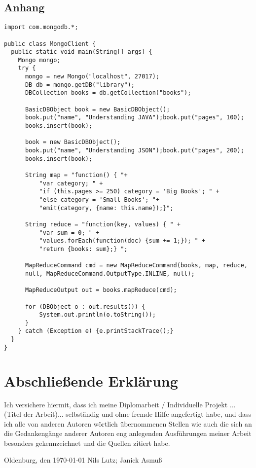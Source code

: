 \newpage
\begin{appendix}

\section{Anhang}
\begin{lstlisting}[caption=MapReduce in Java , label=lst:mapreduce]
import com.mongodb.*;

public class MongoClient {
  public static void main(String[] args) {
    Mongo mongo;
    try {
      mongo = new Mongo("localhost", 27017);
      DB db = mongo.getDB("library");
      DBCollection books = db.getCollection("books");
      
      BasicDBObject book = new BasicDBObject();
      book.put("name", "Understanding JAVA");book.put("pages", 100);
      books.insert(book);
      
      book = new BasicDBObject();
      book.put("name", "Understanding JSON");book.put("pages", 200);
      books.insert(book);
      
      String map = "function() { "+ 
          "var category; " +  
          "if (this.pages >= 250) category = 'Big Books'; " +
          "else category = 'Small Books'; "+  
          "emit(category, {name: this.name});}";
      
      String reduce = "function(key, values) { " +
          "var sum = 0; " +
          "values.forEach(function(doc) {sum += 1;}); " +
          "return {books: sum};} ";
      
      MapReduceCommand cmd = new MapReduceCommand(books, map, reduce,
      null, MapReduceCommand.OutputType.INLINE, null);
      
      MapReduceOutput out = books.mapReduce(cmd);
      
      for (DBObject o : out.results()) {
          System.out.println(o.toString());
      }
    } catch (Exception e) {e.printStackTrace();}
  }
}
\end{lstlisting}

\newpage
{}

\end{appendix}

\newpage
\section*{Abschließende Erklärung}

Ich versichere hiermit, dass ich meine Diplomarbeit / Individuelle Projekt ...(Titel der Arbeit)... selbständig und ohne fremde Hilfe angefertigt habe, und dass ich alle von anderen Autoren wörtlich übernommenen Stellen wie auch die sich an die Gedankengänge anderer Autoren eng anlegenden Ausführungen meiner Arbeit besonders gekennzeichnet und die Quellen zitiert habe.

\vspace*{3cm}
\noindent Oldenburg, den \today \hspace*{2cm} Nils Lutz; Janick Asmuß